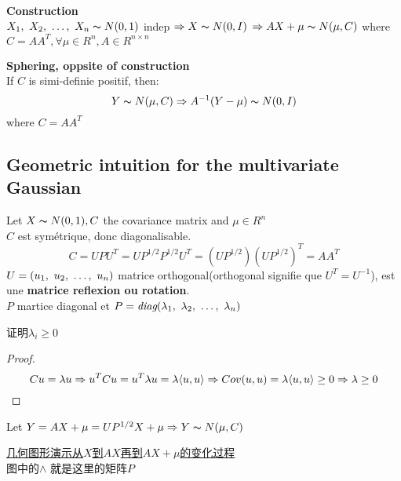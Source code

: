 \documentclass{article}
\begin{document}
\begin{fact}
\textbf{Construction}\\
$X_1,~X_2,~\ldots,~X_n \thicksim{N}(0,1)$ indep $\Rightarrow X \thicksim{N}(0, I)$
$\Rightarrow AX + \mu \thicksim{N}(\mu, C)$ where $C = A A^T, \forall \mu \in R^n, A \in R^{n \times n}$
\end{fact}

\begin{fact}
\textbf{Sphering, oppsite of construction}\\
If $C$ is simi-definie positif, then:
$$Y \thicksim{N}(\mu, C) \Rightarrow A^{-1}(Y - \mu) \thicksim{N}(0,I)$$
where $C = A A^T$
\end{fact}

\subsection{Geometric intuition for the multivariate Gaussian}
Let $X \thicksim{N}(0,1), C $ the covariance matrix and $\mu \in R^n$\\
$C$ est sym\'etrique, donc diagonalisable.
$$
C = U P U^T = U P^{1/2} P^{1/2} U^T = (U P^{1/2}) (U P^{1/2})^T =  A A^T
$$
$U = (u_1,~u_2,~\ldots,~u_n)$ matrice orthogonal(orthogonal signifie que $U^T = U^{-1}$), est une \textbf{matrice reflexion ou rotation}.\\
$P$ martice diagonal et $P = \textit{diag}(\lambda_1,~\lambda_2,~\ldots,~\lambda_n)$

证明$\lambda_i \geq 0$
\begin{proof}
$$Cu = \lambda u \Rightarrow u^T C u = u^T \lambda u = \lambda \langle u , u\rangle \Rightarrow Cov(u,u) = \lambda \langle u , u\rangle \geq 0 \Rightarrow \lambda \geq 0$$
\end{proof}

Let $Y = A X + \mu = U P^{1/2} X + \mu \Rightarrow Y \thicksim{N}(\mu, C)$

\href{http://i.imgbox.com/9t3eUww4.png}{几何图形演示从$X$到$AX$再到$AX+\mu$的变化过程}\\
图中的$\wedge$ 就是这里的矩阵$P$
\end{document}
